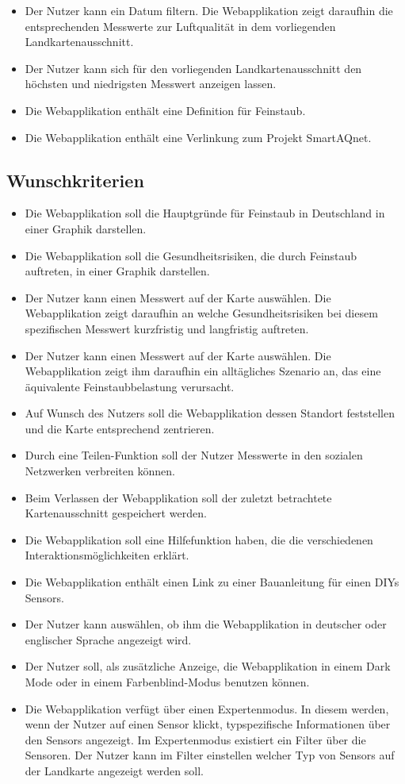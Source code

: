 \begin{itemize}
	und den momentanen Landkartenausschnitt, den Ort oder den \glspl{Sensor} die zeitliche Entwicklung der Luftqualität als Menge-Zeit Diagramm an.
	\item Der Nutzer kann ein Datum filtern. 
	Die Webapplikation zeigt daraufhin die entsprechenden Messwerte zur Luftqualität in dem vorliegenden Landkartenausschnitt.
	\item Der Nutzer kann sich für den vorliegenden Landkartenausschnitt den höchsten und niedrigsten Messwert anzeigen lassen.
	\item Die Webapplikation enthält eine Definition für Feinstaub.
	\item Die Webapplikation enthält eine Verlinkung zum Projekt SmartAQnet. 
\end{itemize}
\subsection{Wunschkriterien}
   \begin{itemize}
   	\item Die Webapplikation soll die Hauptgründe für Feinstaub in Deutschland in einer Graphik darstellen.
   	\item Die Webapplikation soll die Gesundheitsrisiken, die durch Feinstaub auftreten, in einer Graphik darstellen. 
	\item Der Nutzer kann einen Messwert auf der Karte auswählen. 
	Die Webapplikation zeigt daraufhin an welche Gesundheitsrisiken bei diesem spezifischen Messwert kurzfristig und langfristig auftreten.
	\item Der Nutzer kann einen Messwert auf der Karte auswählen. 
	Die Webapplikation zeigt ihm daraufhin ein alltägliches Szenario an, das eine äquivalente Feinstaubbelastung verursacht.
	\item Auf Wunsch des Nutzers soll die Webapplikation dessen Standort feststellen und die Karte entsprechend zentrieren.
	\item Durch eine Teilen-Funktion soll der Nutzer Messwerte in den sozialen Netzwerken verbreiten können.
	\item Beim Verlassen der Webapplikation soll der zuletzt betrachtete Kartenausschnitt gespeichert werden.
	\item Die Webapplikation soll eine Hilfefunktion haben, die die verschiedenen Interaktionsmöglichkeiten erklärt.
	\item Die Webapplikation enthält einen Link zu einer Bauanleitung für einen \glspl{DIY} \glspl{Sensor}.
	\item Der Nutzer kann auswählen, ob ihm die Webapplikation in deutscher oder englischer Sprache angezeigt wird.
	\item Der Nutzer soll, als zusätzliche Anzeige, die Webapplikation in einem Dark Mode oder in einem Farbenblind-Modus benutzen können.
	\item Die Webapplikation verfügt über einen Expertenmodus. In diesem werden, wenn der Nutzer auf einen Sensor klickt, typspezifische Informationen über den \glspl{Sensor} angezeigt.
	Im Expertenmodus existiert ein Filter über die Sensoren. Der Nutzer kann im Filter einstellen welcher Typ von \glspl{Sensor} auf der Landkarte angezeigt werden soll.        
\end{itemize}
